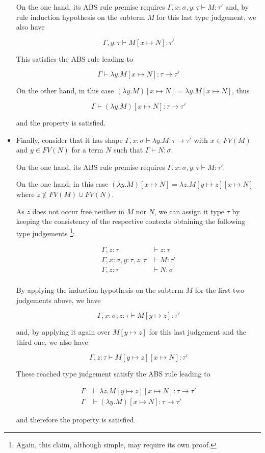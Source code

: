 \documentclass{article}
\begin{document}
\begin{itemize}
    On the one hand, its ABS rule premise requires 
    $\Gamma, x: \sigma, y: \tau \vdash M : \tau'$
    and, by rule induction hypothesis on the subterm $M$
    for this last type judgement, we also have
    
    $$
      \Gamma, y: \tau \vdash M[x \mapsto N] : \tau'
    $$

    This satisfies the ABS rule leading to 

    $$
      \Gamma \vdash \lambda y. M[x \mapsto N] : \tau \rightarrow \tau'
    $$

    On the other hand, in this case 
    $(\lambda y. M)[x \mapsto N] = \lambda y. M[x \mapsto N]$,
    thus
    
    $$\Gamma \vdash (\lambda y. M)[x \mapsto N] : \tau \rightarrow \tau'$$

    and the property is satisfied.
  \item Finally, consider that it has shape 
    $\Gamma, x: \sigma \vdash \lambda y. M : \tau \rightarrow \tau'$ with 
    $x \in FV(M)$ and $y \in FV(N)$ for a term $N$ such that 
    $\Gamma \vdash N: \sigma$.

    On the one hand, its ABS rule premise requires 
    $\Gamma, x: \sigma, y: \tau \vdash M : \tau'$.

    On the one hand, in this case 
    $(\lambda y. M)[x \mapsto N] = \lambda z. M[y \mapsto z][x \mapsto N]$
    where $z \notin FV(M) \cup FV(N)$.

    As $z$ does not occur free neither in $M$ nor $N$, we can assign 
    it type $\tau$ by keeping the consistency of 
    the respective contexts obtaining the following type judgements
    \footnote{Again, this claim, although simple, may require its own proof.}:

    \begin{align*}
      \Gamma, z: \tau &\vdash z: \tau \\
      \Gamma, x: \sigma, y: \tau, z: \tau &\vdash M : \tau' \\
      \Gamma, z: \tau &\vdash N: \sigma \\ 
    \end{align*}
    
    By applying the induction hypothesis on the subterm $M$ 
    for the first two judgements above, we have

    $$
    \Gamma, x: \sigma, z: \tau \vdash M[y \mapsto z] : \tau'
    $$

    and, by applying it again over $M[y \mapsto z]$ for this 
    last judgement and the third one, we also have

    $$
    \Gamma, z: \tau \vdash M[y \mapsto z][x \mapsto N] : \tau'
    $$

    These reached type judgement satisfy the ABS rule leading to

    \begin{align*}
      \Gamma &\vdash \lambda z. M[y \mapsto z][x \mapsto N] : \tau \rightarrow \tau' \\
      \Gamma &\vdash (\lambda y. M)[x \mapsto N] : \tau \rightarrow \tau'
    \end{align*}

    and therefore the property is satisfied.
\end{itemize}
\end{document}
